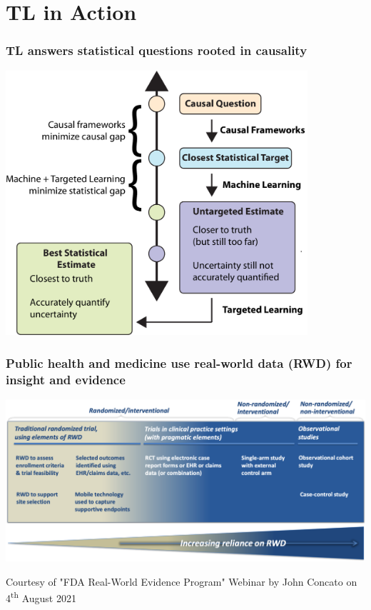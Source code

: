 \documentclass[t]{beamer}
\begin{document}
\section{TL in Action}

\begin{frame}
  \frametitle{TL answers statistical questions rooted in causality}
  \vspace{-1em}
  \begin{center}
  \includegraphics[width=0.84\textwidth]{figures/schematic-fixed.pdf}
  \end{center}
\end{frame}

\begin{frame}
\frametitle{Public health and medicine use real-world data (RWD) for insight
  and evidence}
\vspace{20pt}
\begin{center}
\includegraphics[width=\textwidth]{figures/john_slide8_figure.png}
\end{center}
\vspace{35pt}
\tiny{Courtesy of "FDA Real-World Evidence Program" Webinar by John Concato on
  4\textsuperscript{th} August 2021}
\end{frame}
\end{document}
